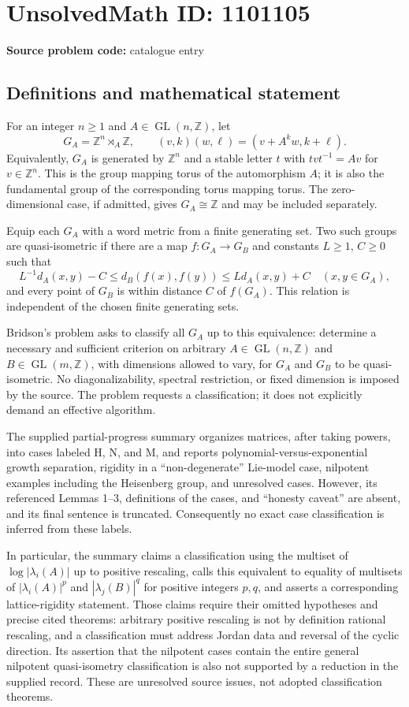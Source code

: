 \documentclass[11pt]{article}
\newcommand{\Z}{\mathbb{Z}}
\begin{document}
\section*{UnsolvedMath ID: 1101105}
\textbf{Source problem code:} catalogue entry
\subsection{Definitions and mathematical statement}
For an integer $n\ge1$ and $A\in\operatorname{GL}(n,\Z)$, let
\[
G_A=\Z^n\rtimes_A\Z,\qquad
(v,k)(w,\ell)=(v+A^k w,k+\ell).
\]
Equivalently, $G_A$ is generated by $\Z^n$ and a stable letter $t$ with $tvt^{-1}=Av$ for $v\in\Z^n$. This is the group mapping torus of the automorphism $A$; it is also the fundamental group of the corresponding torus mapping torus. The zero-dimensional case, if admitted, gives $G_A\cong\Z$ and may be included separately.

Equip each $G_A$ with a word metric from a finite generating set. Two such groups are quasi-isometric if there are a map $f:G_A\to G_B$ and constants $L\ge1$, $C\ge0$ such that
\[
L^{-1}d_A(x,y)-C\le d_B(f(x),f(y))\le Ld_A(x,y)+C
\quad(x,y\in G_A),
\]
and every point of $G_B$ is within distance $C$ of $f(G_A)$. This relation is independent of the chosen finite generating sets.

Bridson's problem asks to classify all $G_A$ up to this equivalence: determine a necessary and sufficient criterion on arbitrary $A\in\operatorname{GL}(n,\Z)$ and $B\in\operatorname{GL}(m,\Z)$, with dimensions allowed to vary, for $G_A$ and $G_B$ to be quasi-isometric. No diagonalizability, spectral restriction, or fixed dimension is imposed by the source. The problem requests a classification; it does not explicitly demand an effective algorithm.

The supplied partial-progress summary organizes matrices, after taking powers, into cases labeled H, N, and M, and reports polynomial-versus-exponential growth separation, rigidity in a ``non-degenerate'' Lie-model case, nilpotent examples including the Heisenberg group, and unresolved cases. However, its referenced Lemmas 1--3, definitions of the cases, and ``honesty caveat'' are absent, and its final sentence is truncated. Consequently no exact case classification is inferred from these labels.

In particular, the summary claims a classification using the multiset of $\log|\lambda_i(A)|$ up to positive rescaling, calls this equivalent to equality of multisets of $|\lambda_i(A)|^p$ and $|\lambda_j(B)|^q$ for positive integers $p,q$, and asserts a corresponding lattice-rigidity statement. Those claims require their omitted hypotheses and precise cited theorems: arbitrary positive rescaling is not by definition rational rescaling, and a classification must address Jordan data and reversal of the cyclic direction. Its assertion that the nilpotent cases contain the entire general nilpotent quasi-isometry classification is also not supported by a reduction in the supplied record. These are unresolved source issues, not adopted classification theorems.
\end{document}
